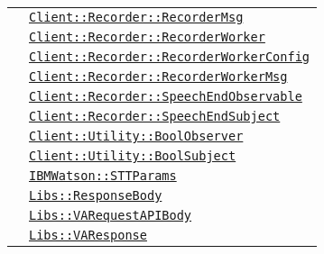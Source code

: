 \begin{longtable}{|>{\centering}m{3cm}|m{10cm}<{\centering}|}
& \hyperref[Client::Recorder::RecorderMsg]{\texttt{Client::Recorder::RecorderMsg}}\\
& \hyperref[Client::Recorder::RecorderWorker]{\texttt{Client::Recorder::RecorderWorker}}\\
& \hyperref[Client::Recorder::RecorderWorkerConfig]{\texttt{Client::Recorder::RecorderWorkerConfig}}\\
& \hyperref[Client::Recorder::RecorderWorkerMsg]{\texttt{Client::Recorder::RecorderWorkerMsg}}\\
& \hyperref[Client::Recorder::SpeechEndObservable]{\texttt{Client::Recorder::SpeechEndObservable}}\\
& \hyperref[Client::Recorder::SpeechEndSubject]{\texttt{Client::Recorder::SpeechEndSubject}}\\
& \hyperref[Client::Utility::BoolObserver]{\texttt{Client::Utility::BoolObserver}}\\
& \hyperref[Client::Utility::BoolSubject]{\texttt{Client::Utility::BoolSubject}}\\
& \hyperref[IBMWatson::STTParams]{\texttt{IBMWatson::STTParams}}\\
& \hyperref[Libs::ResponseBody]{\texttt{Libs::ResponseBody}}\\
& \hyperref[Libs::VARequestAPIBody]{\texttt{Libs::VARequestAPIBody}}\\
& \hyperref[Libs::VAResponse]{\texttt{Libs::VAResponse}}\\ \hline


\end{longtable}
